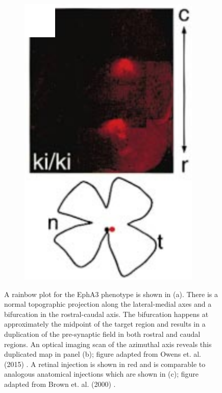 \begin{figure}
\begin{subfigure}{0.3\textwidth}
		\centering
		\includegraphics[width=\textwidth]{images/distributed_kernels/epha3anatomical}
		\caption{}
	\end{subfigure}
	\def\c{A rainbow plot for the EphA3 phenotype.}
	\caption[\c]{\label{fig:epha3_rainbow} A rainbow plot for the EphA3 phenotype is shown in (a). There is a normal topographic projection along the lateral-medial axes and a bifurcation in the rostral-caudal axis. The bifurcation happens at approximately the midpoint of the target region and results in a duplication of the pre-synaptic field in both rostral and caudal regions. An optical imaging scan of the azimuthal axis reveals this duplicated map in panel (b); figure adapted from Owens et. al. (2015) \cite{Owens2015-zv}. A retinal injection is shown in red and is comparable to analogous anatomical injections which are shown in (c); figure adapted from Brown et. al. (2000) \cite{Brown2000-da}. }
\end{figure}



